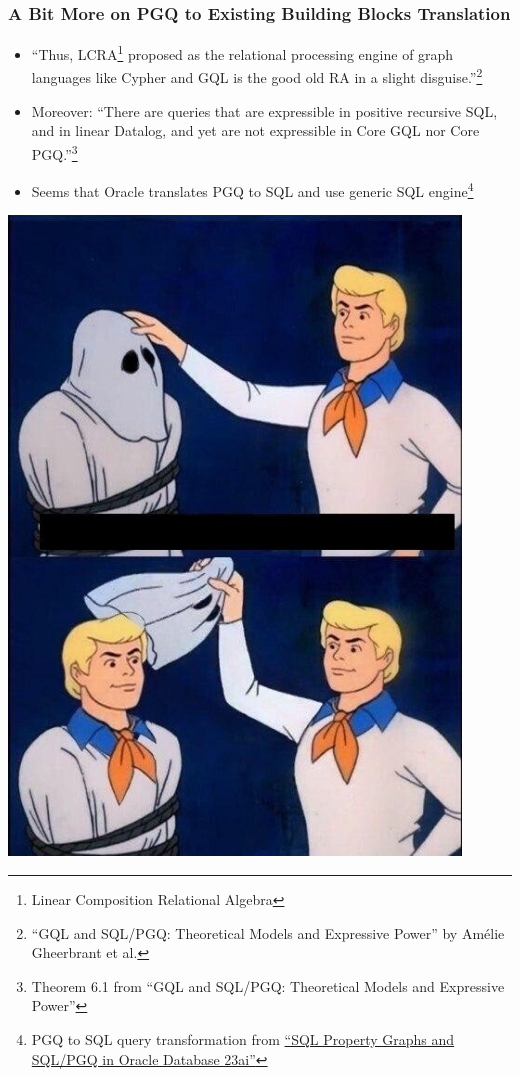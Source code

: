 \documentclass[xcolor=table,aspectratio=169]{beamer}
\begin{document}
\begin{frame}[fragile]
  \frametitle{A Bit More on PGQ to Existing Building Blocks Translation}
  \begin{minipage}[t]{0.72\textwidth}
    \begin{itemize}
      \item ``Thus, LCRA\footnote{Linear Composition Relational Algebra} proposed as the relational processing engine of graph languages like Cypher and GQL is the good old RA in a slight disguise.''\footnote{``GQL and SQL/PGQ: Theoretical Models and Expressive Power'' by Amélie Gheerbrant et al.}
      \item Moreover: ``There are queries that are expressible in positive recursive SQL, and in linear Datalog, and yet are not expressible in Core GQL nor Core PGQ.''\footnote{Theorem 6.1 from ``GQL and SQL/PGQ: Theoretical Models and Expressive Power''}
      \item Seems that Oracle translates PGQ to SQL and use generic SQL engine\footnote{PGQ to SQL query transformation from \href{https://oracle-base.com/articles/23/sql-property-graphs-and-sql-pgq-23\#query-transformation}{``SQL Property Graphs and SQL/PGQ in Oracle Database 23ai''}}
    \end{itemize}
\end{minipage}
\begin{minipage}[t]{0.27\textwidth}
  \pause
  \begin{center}
  \includegraphics[valign=t,width=0.9\textwidth]{pictures/meme-template.jpeg}
  \end{center}
\end{minipage}
\end{frame}
\end{document}
